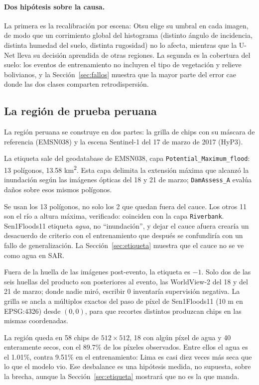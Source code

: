 \documentclass{article}
\begin{document}
\paragraph{Dos hipótesis sobre la causa.}
La primera es la recalibración por escena: Otsu elige su umbral en cada
imagen, de modo que un corrimiento global del histograma (distinto ángulo de
incidencia, distinta humedad del suelo, distinta rugosidad) no lo afecta,
mientras que la U-Net lleva su decisión aprendida de otras regiones. La segunda
es la cobertura del suelo: los eventos de entrenamiento no incluyen el
tipo de vegetación y relieve bolivianos, y la Sección~\ref{sec:fallos} muestra
que la mayor parte del error cae donde las dos clases comparten
retrodispersión.

\subsection{La región de prueba peruana}
\label{sec:lima}

La región peruana se construye en dos partes: la grilla de chips con su máscara
de referencia (EMSN038) y la escena Sentinel-1 del 17 de marzo de 2017 (HyP3).

La etiqueta sale del geodatabase de EMSN038, capa
\texttt{Potential\_Maximum\_flood}: 13 polígonos, 13.58 km\textsuperscript{2}. Esta
capa delimita la extensión máxima que alcanzó la inundación según las imágenes
ópticas del 18 y 21 de marzo; \texttt{DamAssess\_A} evalúa daños sobre esos mismos
polígonos.

Se usan los 13 polígonos, no solo los 2 que quedan fuera del cauce. Los
otros 11 son el río a altura máxima, verificado: coinciden con la capa
\texttt{Riverbank}. Sen1Floods11 etiqueta \emph{agua}, no ``inundación'', y
dejar el cauce afuera crearía un desacuerdo de criterio con el entrenamiento
que después se confundiría con un fallo de generalización. La
Sección~\ref{sec:etiqueta} muestra que el cauce no se ve como agua en SAR.

Fuera de la huella de las imágenes post-evento, la etiqueta es $-1$. Solo
dos de las seis huellas del producto son posteriores al evento, las WorldView-2 del
18 y del 21 de marzo; donde nadie miró, escribir 0 inventaría supervisión
negativa. La grilla se ancla a múltiplos exactos del paso de
píxel de Sen1Floods11 (10 m en EPSG:4326) desde $(0,0)$, para que recortes
distintos produzcan chips en las mismas coordenadas.

La región queda en 58 chips de $512\times512$, 18 con algún píxel de
agua y 40 enteramente secos, con el 89.7\% de los píxeles observados. Entre
ellos el agua es el 1.01\%, contra 9.51\% en el entrenamiento:
Lima es casi diez veces más seca que lo que el modelo vio. Ese
desbalance es una hipótesis medida, no supuesta, sobre la brecha, aunque la
Sección~\ref{sec:etiqueta} mostrará que no es la que manda.
\end{document}
